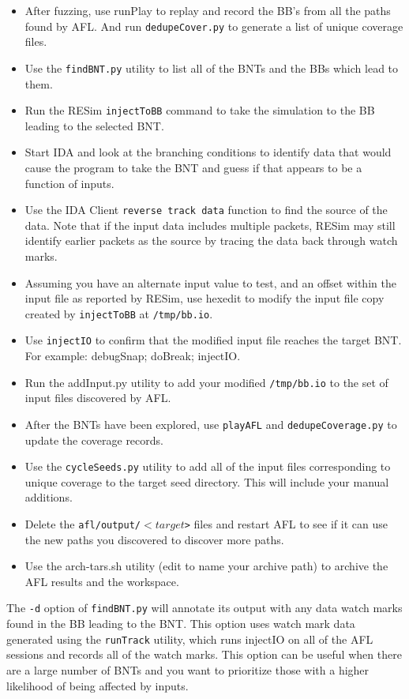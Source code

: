 \documentclass[titlepage]{article}
\begin{document}
\begin{itemize}
\item After fuzzing, use runPlay to replay and record the BB's from all the paths found by AFL.  And run {\tt dedupeCover.py} to generate a list of unique coverage files.
\item Use the {\tt findBNT.py} utility to list all of the BNTs and the BBs which lead to them.
\item Run the RESim {\tt injectToBB} command to take the simulation to the BB leading to the selected BNT.
\item Start IDA and look at the branching conditions to identify data that would cause the program to take the BNT and guess if that appears to be a function of inputs.  
\item Use the IDA Client {\tt reverse track data} function to find the source of the data.  Note that if the input data includes multiple packets, RESim may still
identify earlier packets as the source by tracing the data back through watch marks.
\item Assuming you have an alternate input value to test, and an offset within the input file as reported by RESim, use hexedit to modify the input file copy
created by {\tt injectToBB} at {\tt /tmp/bb.io}.
\item Use {\tt injectIO} to confirm that the modified input file reaches the target BNT.  For example: debugSnap; doBreak; injectIO.
\item Run the addInput.py utility to add your modified {\tt /tmp/bb.io} to the set of input files discovered by AFL.
\item After the BNTs have been explored, use {\tt playAFL} and {\tt dedupeCoverage.py} to update the coverage records.
\item Use the {\tt cycleSeeds.py} utility to add all of the input files corresponding to unique coverage to the target seed directory.  This will include your manual additions.
\item Delete the {\tt afl/output/$<target$>} files and restart AFL to see if it can use the new paths you discovered to discover more paths.
\item Use the arch-tars.sh utility (edit to name your archive path) to archive the AFL results and the workspace.
\end{itemize}

The {\tt -d} option of {\tt findBNT.py} will annotate its output with any data watch marks found in the BB leading to the BNT.  This option uses watch mark data generated
using the {\tt runTrack} utility, which runs injectIO on all of the AFL sessions and records all of the watch marks.  This option can be useful when there are a large number
of BNTs and you want to prioritize those with a higher likelihood of being affected by inputs.
\end{document}
